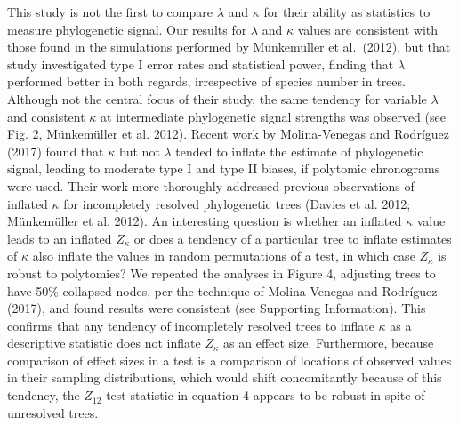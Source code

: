 \documentclass[
]{article}
\begin{document}
{This study is not the first to compare \(\lambda\) and \(\kappa\) for
their ability as statistics to measure phylogenetic signal. Our results
for \(\lambda\) and \(\kappa\) values are consistent with those found in
the simulations performed by Münkemüller et al.~(2012), but that study
investigated type I error rates and statistical power, finding that
\(\lambda\) performed better in both regards, irrespective of species
number in trees. Although not the central focus of their study, the same
tendency for variable \(\lambda\) and consistent \(\kappa\) at
intermediate phylogenetic signal strengths was observed (see Fig. 2,
Münkemüller et al. 2012). Recent work by Molina-Venegas and Rodríguez
(2017) found that \(\kappa\) but not \(\lambda\) tended to inflate the
estimate of phylogenetic signal, leading to moderate type I and type II
biases, if polytomic chronograms were used. Their work more thoroughly
addressed previous observations of inflated \(\kappa\) for incompletely
resolved phylogenetic trees (Davies et al. 2012; Münkemüller et al.
2012). An interesting question is whether an inflated \(\kappa\) value
leads to an inflated \(Z_\kappa\) or does a tendency of a particular
tree to inflate estimates of \(\kappa\) also inflate the values in
random permutations of a test, in which case \(Z_\kappa\) is robust to
polytomies? We repeated the analyses in Figure 4, adjusting trees to
have 50\% collapsed nodes, per the technique of Molina-Venegas and
Rodríguez (2017), and found results were consistent (see Supporting
Information). This confirms that any tendency of incompletely resolved
trees to inflate \(\kappa\) as a descriptive statistic does not inflate
\(Z_\kappa\) as an effect size. Furthermore, because comparison of
effect sizes in a test is a comparison of locations of observed values
in their sampling distributions, which would shift concomitantly because
of this tendency, the \(Z_{12}\) test statistic in equation 4 appears to
be robust in spite of unresolved trees. \hfill\break  

}
\end{document}
